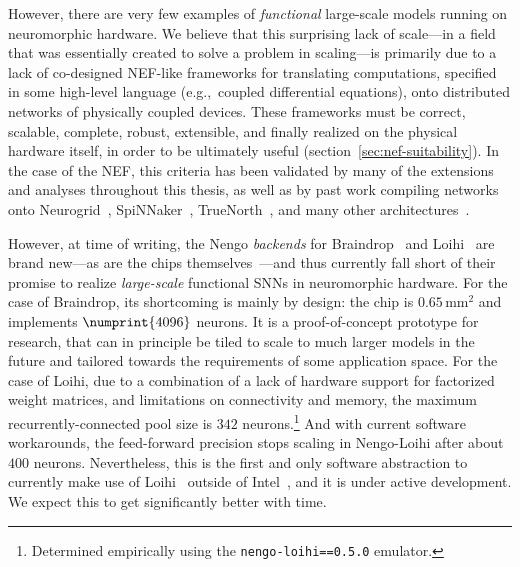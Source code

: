 However, there are very few examples of \emph{functional} large-scale models running on neuromorphic hardware.
We believe that this surprising lack of scale---in a field that was essentially created to solve a problem in scaling---is primarily due to a lack of co-designed NEF-like frameworks for translating computations, specified in some high-level language (e.g.,~coupled differential equations), onto distributed networks of physically coupled devices.
These frameworks must be correct, scalable, complete, robust, extensible, and finally realized on the physical hardware itself, in order to be ultimately useful (section~\ref{sec:nef-suitability}).
In the case of the NEF, this criteria has been validated by many of the extensions and analyses throughout this thesis, as well as by past work compiling networks onto
Neurogrid~\citep{dethier2011brain},
SpiNNaker~\citep{mundy2015, mundy2016real, knight2016},
TrueNorth~\citep{fischl2018},
and many other architectures~\citep{naylor2013managing, bekolay2014, corradi2014, wang2014compact, berzish2016, wang2017neuromorphic, rasmussen2018nengodl, blouw2018a}.

However, at time of writing, the Nengo \emph{backends} for Braindrop~\citep{braindrop2019} and Loihi~\citep{nengoloihi} are brand new---as are the chips themselves~\citep{neckar2018braindrop, davies2018loihi}---and thus currently fall short of their promise to realize \emph{large-scale} functional SNNs in neuromorphic hardware.
For the case of Braindrop, its shortcoming is mainly by design: the chip is $0.65$\,mm${}^2$ and implements $\numprint{4096}$ neurons.
It is a proof-of-concept prototype for research, that can in principle be tiled to scale to much larger models in the future and tailored towards the requirements of some application space.
For the case of Loihi, due to a combination of a lack of hardware support for factorized weight matrices, and limitations on connectivity and memory, the maximum recurrently-connected pool size is $342$ neurons.\footnote{%
Determined empirically using the \texttt{nengo-loihi==0.5.0} emulator.}
And with current software workarounds, the feed-forward precision stops scaling in Nengo-Loihi after about $400$ neurons.
Nevertheless, this is the first and only software abstraction to currently make use of Loihi~\citep{blouw2018a} outside of Intel~\citep{lin2018mapping}, and it is under active development.
We expect this to get significantly better with time.

